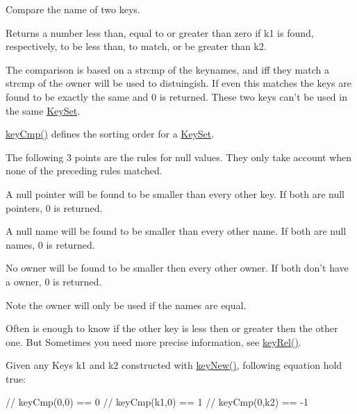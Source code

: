 Compare the name of two keys.

\begin{DoxyReturn}{Returns}
a number less than, equal to or greater than zero if k1 is found, respectively, to be less than, to match, or be greater than k2.
\end{DoxyReturn}
The comparison is based on a strcmp of the keynames, and iff they match a strcmp of the owner will be used to distuingish. If even this matches the keys are found to be exactly the same and 0 is returned. These two keys can't be used in the same \hyperlink{classkdb_1_1KeySet}{Key\-Set}.

\hyperlink{group__keytest_gaf6e66e12fe04d535a5d1c8218ced803e}{key\-Cmp()} defines the sorting order for a \hyperlink{classkdb_1_1KeySet}{Key\-Set}.

The following 3 points are the rules for null values. They only take account when none of the preceding rules matched.


\begin{DoxyItemize}
\item A null pointer will be found to be smaller than every other key. If both are null pointers, 0 is returned.
\end{DoxyItemize}


\begin{DoxyItemize}
\item A null name will be found to be smaller than every other name. If both are null names, 0 is returned.
\end{DoxyItemize}


\begin{DoxyItemize}
\item No owner will be found to be smaller then every other owner. If both don't have a owner, 0 is returned.
\end{DoxyItemize}

\begin{DoxyNote}{Note}
the owner will only be used if the names are equal.
\end{DoxyNote}
Often is enough to know if the other key is less then or greater then the other one. But Sometimes you need more precise information, see \hyperlink{group__keytest_ga6bb0f95ac34ce9c42d61bb35a76139d0}{key\-Rel()}.

Given any Keys k1 and k2 constructed with \hyperlink{group__key_gaf6893c038b3ebee90c73a9ea8356bebf}{key\-New()}, following equation hold true\-:


\begin{DoxyCode}
\textcolor{comment}{// keyCmp(0,0) == 0}
\textcolor{comment}{// keyCmp(k1,0) ==  1}
\textcolor{comment}{// keyCmp(0,k2) == -1}
\end{DoxyCode}



